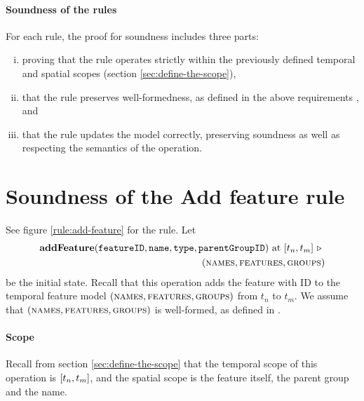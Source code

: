 \paragraph{Soundness of the rules}
For each rule, the proof for soundness includes three parts: 
\begin{enumerate}[(i)]
   \item proving that the rule operates strictly within the previously defined temporal and spatial scopes (section \vref{sec:define-the-scope}), 
   \item that the rule preserves well-formedness, as defined in the above requirements , and
   \item that the rule updates the model correctly, preserving soundness as well as respecting the semantics of the operation.
\end{enumerate}

\section{Soundness of the Add feature rule}
\label{sec:soundness-of-the-add-feature-rule}


See figure \vref{rule:add-feature} for the  rule.
Let 
\begin{equation*}
   \begin{split}
      \textbf{addFeature}(\var{featureID}, \var{name}, \var{type}, \var{parentGroupID})\text{ at }\interval{t_n}{t_m}
      \shove \\
   (\names{}, \features{}, \groups{})
\end{split}
\end{equation*}
be the initial state. Recall that this operation adds the feature with ID  to the temporal feature model $(\textsc{names}{}, \textsc{features}{}, \textsc{groups}{}{})$ from $t_n$ to $t_m$. We assume that $(\textsc{names}{}, \textsc{features}{}, \textsc{groups}{}{})$ is well-formed, as defined in .


\paragraph{Scope}

Recall from section \vref{sec:define-the-scope} that the temporal scope of this operation is $\interval{t_n}{t_m}$, and the spatial scope is the feature itself, the parent group and the name. 

